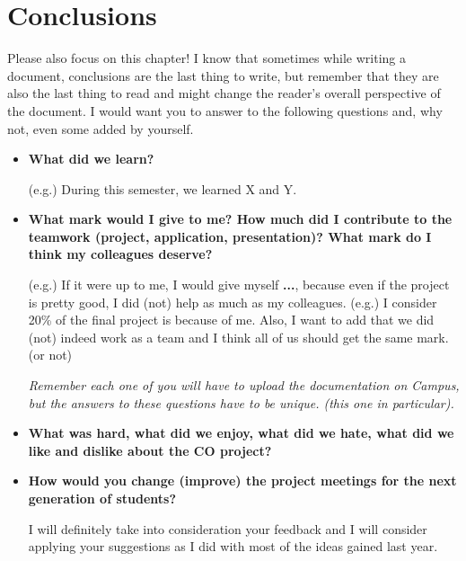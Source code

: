 \chapter{Conclusions}

Please also focus on this chapter! I know that sometimes while writing a document, conclusions are the last thing to write, but remember that they are also the last thing to read and might change the reader's overall perspective of the document. I would want you to answer to the following questions and, why not, even some added by yourself. 

\begin{itemize}
  \item \textbf{What did we learn?}
  
  (e.g.) During this semester, we learned X and Y. 
  
  \item \textbf{What mark would I give to me? How much did I contribute to the teamwork (project, application, presentation)? What mark do I think my colleagues deserve?}
  
  (e.g.) If it were up to me, I would give myself \textbf{...}, because even if the project is pretty good, I did (not) help as much as my colleagues. (e.g.) I consider 20\% of the final project is because of me. Also, I want to add that we did (not) indeed work as a team and I think all of us should get the same mark. (or not) 
  
  \textit{Remember each one of you will have to upload the documentation on Campus, but the answers to these questions have to be unique. (this one in particular).}

  \item \textbf{What was hard, what did we enjoy, what did we hate, what did we like and dislike about the CO project?}
  
  \item \textbf{How would you change (improve) the project meetings for the next generation of students?}
  
  I will definitely take into consideration your feedback and I will consider applying your suggestions as I did with most of the ideas gained last year.
  
\end{itemize}